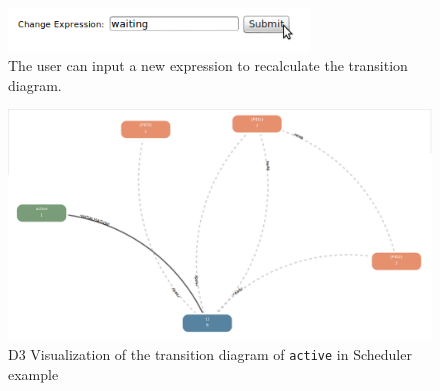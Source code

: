 \begin{center}
\begin{figure}[h!]
\centering
\includegraphics[width=8cm]{bilder/transDiag-UI.png}
\caption{The user can input a new expression to recalculate the transition diagram.}
\label{transDiagUI}
\end{figure}
\end{center}


\begin{center}
\begin{figure}[h!]
\centering
\includegraphics[width=14cm]{bilder/transdiag.png}
\caption{D3 Visualization of the transition diagram of \texttt{active} in Scheduler example}
\label{transdiag}
\end{figure}
\end{center} 

\pagebreak

